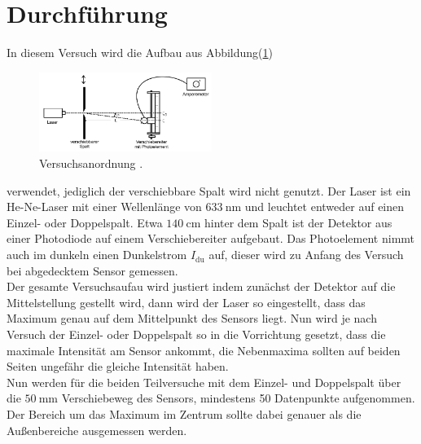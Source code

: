 \section{Durchführung}

    \noindent In diesem Versuch wird die Aufbau aus Abbildung(\ref{img:Versuch})

    \begin{figure}[ht]
        \centering
        \includegraphics[width=0.5\textwidth]{latex/images/Versuch.PNG}
        \caption{Versuchsanordnung \protect \cite{V406}.}
        \label{img:Versuch}
    \end{figure}

    \noindent verwendet, jediglich der verschiebbare Spalt wird nicht genutzt. Der Laser ist ein He-Ne-Laser mit einer Wellenlänge von 
    $\SI{633}{\nano\meter}$ und leuchtet entweder auf einen Einzel- oder Doppelspalt. Etwa $\SI{140}{\centi\meter}$ hinter dem Spalt ist der 
    Detektor aus einer Photodiode auf einem Verschiebereiter aufgebaut. Das Photoelement nimmt auch im dunkeln einen Dunkelstrom
    $I_{\text{du}}$ auf, dieser wird zu Anfang des Versuch bei abgedecktem Sensor gemessen.\\

    \noindent Der gesamte Versuchsaufau wird justiert indem zunächst der Detektor auf die Mittelstellung gestellt wird, dann wird der Laser so eingestellt, 
    dass das Maximum genau auf dem Mittelpunkt des Sensors liegt. Nun wird je nach Versuch der Einzel- oder Doppelspalt so in die Vorrichtung 
    gesetzt, dass die maximale Intensität am Sensor ankommt, die Nebenmaxima sollten auf beiden Seiten ungefähr die gleiche Intensität haben.\\

    \noindent Nun werden für die beiden Teilversuche mit dem Einzel- und Doppelspalt über die $\SI{50}{\milli\meter}$ Verschiebeweg des Sensors, 
    mindestens 50 Datenpunkte aufgenommen. Der Bereich um das Maximum im Zentrum sollte dabei genauer als die Außenbereiche ausgemessen werden.


    